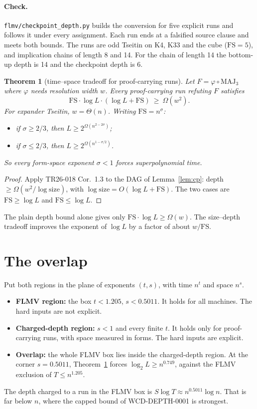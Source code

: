 \documentclass[11pt]{article}
\newtheorem{theorem}{Theorem}
\begin{document}
\paragraph{Check.} \texttt{flmv/checkpoint\_depth.py} builds the conversion for five explicit runs and follows it under every assignment. Each run ends at a falsified source clause and meets both bounds. The runs are odd Tseitin on K4, K33 and the cube ($\mathrm{FS}=5$), and implication chains of length 8 and 14. For the chain of length 14 the bottom-up depth is 14 and the checkpoint depth is 6.

\begin{theorem}[time--space tradeoff for proof-carrying runs]\label{thm:ts}
Let $F=\varphi\circ\mathrm{MAJ}_3$ where $\varphi$ needs resolution width $w$. Every proof-carrying run refuting $F$ satisfies
\[\mathrm{FS}\cdot\log L\cdot(\log L+\mathrm{FS})\ \ge\ \Omega(w^2).\]
For expander Tseitin, $w=\Theta(n)$. Writing $\mathrm{FS}=n^{\sigma}$:
\begin{itemize}
\item if $\sigma\ge2/3$, then $L\ge2^{\Omega(n^{2-2\sigma})}$;
\item if $\sigma\le2/3$, then $L\ge2^{\Omega(n^{1-\sigma/2})}$.
\end{itemize}
So every form-space exponent $\sigma<1$ forces superpolynomial time.
\end{theorem}
\begin{proof}
Apply TR26-018 Cor.~1.3 to the DAG of Lemma~\ref{lem:cp}: depth $\ge\Omega(w^2/\log\text{size})$, with $\log\text{size}=O(\log L+\mathrm{FS})$. The two cases are $\mathrm{FS}\ge\log L$ and $\mathrm{FS}\le\log L$.
\end{proof}
The plain depth bound alone gives only $\mathrm{FS}\cdot\log L\ge\Omega(w)$. The size--depth tradeoff improves the exponent of $\log L$ by a factor of about $w/\mathrm{FS}$.

\section{The overlap}
Put both regions in the plane of exponents $(t,s)$, with time $n^{t}$ and space $n^{s}$.
\begin{itemize}
\item \textbf{FLMV region:} the box $t<1.205$, $s<0.5011$. It holds for all machines. The hard inputs are not explicit.
\item \textbf{Charged-depth region:} $s<1$ and every finite $t$. It holds only for proof-carrying runs, with space measured in forms. The hard inputs are explicit.
\item \textbf{Overlap:} the whole FLMV box lies inside the charged-depth region. At the corner $s=0.5011$, Theorem~\ref{thm:ts} forces $\log_2L\ge n^{0.749}$, against the FLMV exclusion of $T\le n^{1.205}$.
\end{itemize}
The depth charged to a run in the FLMV box is $S\log T\approx n^{0.5011}\log n$. That is far below $n$, where the capped bound of WCD-DEPTH-0001 is strongest.
\end{document}
